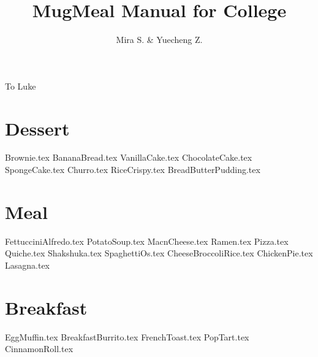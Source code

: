 \documentclass{article}
\title{MugMeal Manual for College}
\author{Mira S. \& Yuecheng Z.}
\begin{document}
\maketitle
\newpage
\null{}
\vspace{5em}
\begin{LARGE} 
\hspace{3em}To Luke
\end{LARGE}
\newpage
\tableofcontents
\setcounter{tocdepth}{2}



\newpage
\section{Dessert} 
\localtableofcontents
{Brownie.tex}
{BananaBread.tex}
{VanillaCake.tex}
{ChocolateCake.tex}
{SpongeCake.tex}
{Churro.tex}
{RiceCrispy.tex}
{BreadButterPudding.tex}



\newpage
\section{Meal} 
\localtableofcontents
{FettucciniAlfredo.tex}
{PotatoSoup.tex}
{MacnCheese.tex}
{Ramen.tex}
{Pizza.tex}
{Quiche.tex}
{Shakshuka.tex}
{SpaghettiOs.tex}
{CheeseBroccoliRice.tex}
{ChickenPie.tex}
{Lasagna.tex}



\newpage
\section {Breakfast}
\localtableofcontents
{EggMuffin.tex}
{BreakfastBurrito.tex}
{FrenchToast.tex}
{PopTart.tex}
{CinnamonRoll.tex}
\end{document}
